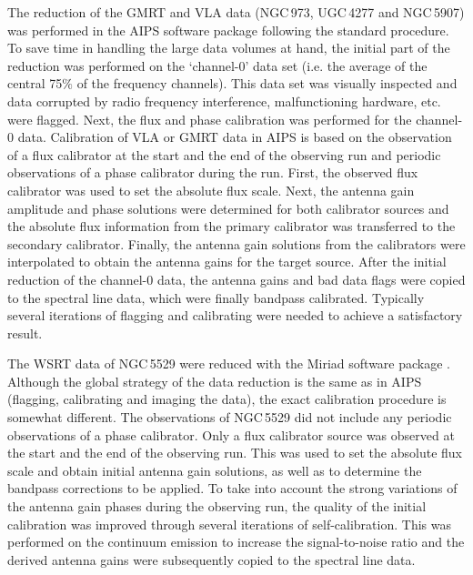 \documentclass{aa}
\begin{document}
The reduction of the GMRT and VLA data (NGC\,973, UGC\,4277 and NGC\,5907) was performed in the AIPS software package \citep{greisen03} following the standard procedure. To save time in handling the large data volumes at hand, the initial part of the reduction was performed on the `channel-0' data set (i.e. the average of the central 75$\%$ of the frequency channels). This data set was visually inspected and data corrupted by radio frequency interference, malfunctioning hardware, etc. were flagged. Next, the flux and phase calibration was performed for the channel-0 data. Calibration of VLA or GMRT data in AIPS is based on the observation of a flux calibrator at the start and the end of the observing run and periodic observations of a phase calibrator during the run. First, the observed flux calibrator was used to set the absolute flux scale. Next, the antenna gain amplitude and phase solutions were determined for both calibrator sources and the absolute flux information from the primary calibrator was transferred to the secondary calibrator. Finally, the antenna gain solutions from the calibrators were interpolated to obtain the antenna gains for the target source. After the initial reduction of the channel-0 data, the antenna gains and bad data flags were copied to the spectral line data, which were finally bandpass calibrated. Typically several iterations of flagging and calibrating were needed to achieve a satisfactory result.
\par
The WSRT data of NGC\,5529 were reduced with the Miriad software package \citep{sault95}. Although the global strategy of the data reduction is the same as in AIPS (flagging, calibrating and imaging the data), the exact calibration procedure is somewhat different. The observations of NGC\,5529 did not include any  periodic observations of a phase calibrator. Only a flux calibrator source was observed at the start and the end of the observing run. This was used to set the absolute flux scale and obtain initial antenna gain solutions, as well as to determine the bandpass corrections to be applied. To take into account the strong variations of the antenna gain phases during the observing run, the quality of the initial calibration was improved through several iterations of self-calibration. This was performed on the continuum emission to increase the signal-to-noise ratio and the derived antenna gains were subsequently copied to the spectral line data.
\par
\end{document}
